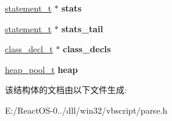 \begin{DoxyCompactItemize}
\mbox{\label{structparser__ctx__t_a468ad2ec9c98323f8c491e29e2b4709f}} 
\hyperlink{struct__statement__t}{statement\+\_\+t} $\ast$ {\bfseries stats}
\item 
\mbox{\label{structparser__ctx__t_a868fbdd5eb18d4e0f6ecc5e9df010f7a}} 
\hyperlink{struct__statement__t}{statement\+\_\+t} $\ast$ {\bfseries stats\+\_\+tail}
\item 
\mbox{\label{structparser__ctx__t_a14f3492d685f82a2447d544b629d458f}} 
\hyperlink{struct__class__decl__t}{class\+\_\+decl\+\_\+t} $\ast$ {\bfseries class\+\_\+decls}
\item 
\mbox{\label{structparser__ctx__t_abb69880a73cb2731ef3caa8265b785f5}} 
\hyperlink{structheap__pool__t}{heap\+\_\+pool\+\_\+t} {\bfseries heap}
\end{DoxyCompactItemize}


该结构体的文档由以下文件生成\+:\begin{DoxyCompactItemize}
\item 
E\+:/\+React\+O\+S-\/0../dll/win32/vbscript/parse.\+h\end{DoxyCompactItemize}
